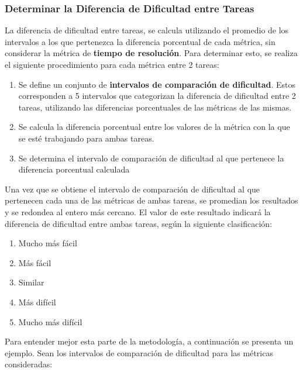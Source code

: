 \documentclass[letterpaper,12pt]{article}
\begin{document}
\subsubsection{Determinar la Diferencia de Dificultad entre Tareas}

La diferencia de dificultad entre tareas, se calcula utilizando el promedio de los intervalos a los que pertenezca la diferencia porcentual de cada métrica, sin considerar la métrica de \textbf{tiempo de resolución}. Para determinar esto, se realiza el siguiente procedimiento para cada métrica entre 2 tareas:
\begin{enumerate}
  \item Se define un conjunto de \textbf{intervalos de comparación de dificultad}. Estos corresponden a 5 intervalos que categorizan la diferencia de dificultad entre 2 tareas, utilizando las diferencias porcentuales de las métricas de las mismas.
  \item Se calcula la diferencia porcentual entre los valores de la métrica con la que se esté trabajando para ambas tareas.
  \item Se determina el intervalo de comparación de dificultad al que pertenece la diferencia porcentual calculada
\end{enumerate}
Una vez que se obtiene el intervalo de comparación de dificultad al que pertenecen cada una de las métricas de ambas tareas, se promedian los resultados y se redondea al entero más cercano. El valor de este resultado indicará la diferencia de dificultad entre ambas tareas, según la siguiente clasificación:
\begin{enumerate}
  \item Mucho más fácil
  \item Más fácil
  \item Similar
  \item Más difícil
  \item Mucho más difícil
\end{enumerate}

Para entender mejor esta parte de la metodología, a continuación se presenta un ejemplo. Sean los intervalos de comparación de dificultad para las métricas consideradas:
\end{document}
